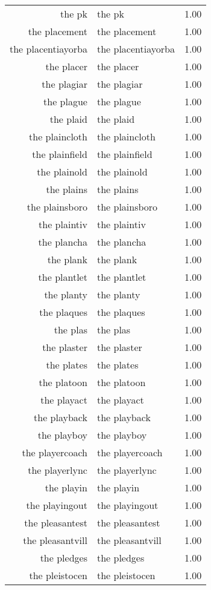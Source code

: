 \begin{table}[ht]
\begin{tabular}{rlr}
  the pk & the pk & 1.00 \\ 
  the placement & the placement & 1.00 \\ 
  the placentiayorba & the placentiayorba & 1.00 \\ 
  the placer & the placer & 1.00 \\ 
  the plagiar & the plagiar & 1.00 \\ 
  the plague & the plague & 1.00 \\ 
  the plaid & the plaid & 1.00 \\ 
  the plaincloth & the plaincloth & 1.00 \\ 
  the plainfield & the plainfield & 1.00 \\ 
  the plainold & the plainold & 1.00 \\ 
  the plains & the plains & 1.00 \\ 
  the plainsboro & the plainsboro & 1.00 \\ 
  the plaintiv & the plaintiv & 1.00 \\ 
  the plancha & the plancha & 1.00 \\ 
  the plank & the plank & 1.00 \\ 
  the plantlet & the plantlet & 1.00 \\ 
  the planty & the planty & 1.00 \\ 
  the plaques & the plaques & 1.00 \\ 
  the plas & the plas & 1.00 \\ 
  the plaster & the plaster & 1.00 \\ 
  the plates & the plates & 1.00 \\ 
  the platoon & the platoon & 1.00 \\ 
  the playact & the playact & 1.00 \\ 
  the playback & the playback & 1.00 \\ 
  the playboy & the playboy & 1.00 \\ 
  the playercoach & the playercoach & 1.00 \\ 
  the playerlync & the playerlync & 1.00 \\ 
  the playin & the playin & 1.00 \\ 
  the playingout & the playingout & 1.00 \\ 
  the pleasantest & the pleasantest & 1.00 \\ 
  the pleasantvill & the pleasantvill & 1.00 \\ 
  the pledges & the pledges & 1.00 \\ 
  the pleistocen & the pleistocen & 1.00 \\ 

\end{tabular}
\end{table}
